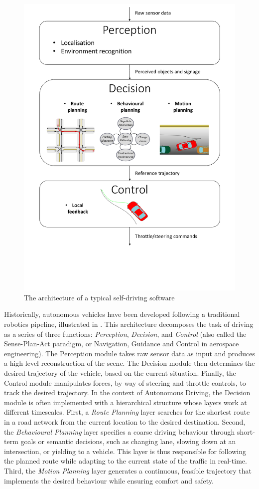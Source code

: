 \begin{figure}[th]
	\centering
	\includegraphics[trim={0 5cm 0 0}, clip, width=0.7\linewidth]{img/pipeline}
	\caption{The architecture of a typical self-driving software}
	\label{fig:robotics-pipeline}
\end{figure}

Historically, autonomous vehicles have been developed following a traditional robotics pipeline, illustrated in . This architecture decomposes the task of driving as a series of three functions: \emph{Perception}, \emph{Decision}, and \emph{Control} (also called the Sense-Plan-Act paradigm, or Navigation, Guidance and Control in aerospace engineering). The {Perception} module takes raw sensor data as input and produces a high-level reconstruction of the scene. The {Decision} module then determines the desired trajectory of the vehicle, based on the current situation. Finally, the {Control} module manipulates forces, by way of steering and throttle controls, to track the desired trajectory. In the context of Autonomous Driving, the Decision module is often implemented with a hierarchical structure whose layers work at different timescales. First, a \emph{Route Planning} layer searches for the shortest route in a road network from the current location to the desired destination. Second, the \emph{Behavioural Planning} layer specifies a coarse driving behaviour through short-term goals or semantic decisions, such as changing lane, slowing down at an intersection, or yielding to a vehicle. This layer is thus responsible for following the planned route while adapting to the current state of the traffic in real-time. Third, the \emph{Motion Planning} layer generates a continuous, feasible trajectory that implements the desired behaviour while ensuring comfort and safety.

